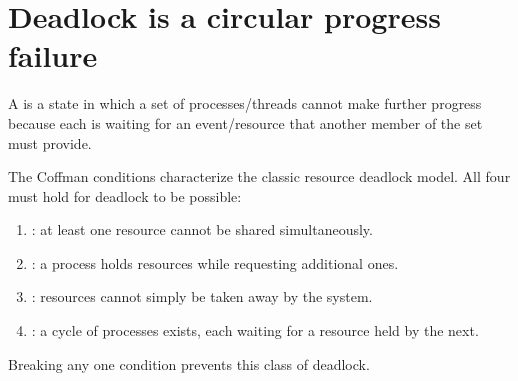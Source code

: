 \section{Deadlock is a circular progress failure}
A  is a state in which a set of processes/threads cannot make further progress because each is waiting for an event/resource that another member of the set must provide.

The Coffman conditions characterize the classic resource deadlock model. All four must hold for deadlock to be possible:
\begin{enumerate}
  \item {}: at least one resource cannot be shared simultaneously.
  \item {}: a process holds resources while requesting additional ones.
  \item {}: resources cannot simply be taken away by the system.
  \item {}: a cycle of processes exists, each waiting for a resource held by the next.
\end{enumerate}
Breaking any one condition prevents this class of deadlock.

\begin{mlfigure}
\end{mlfigure}

